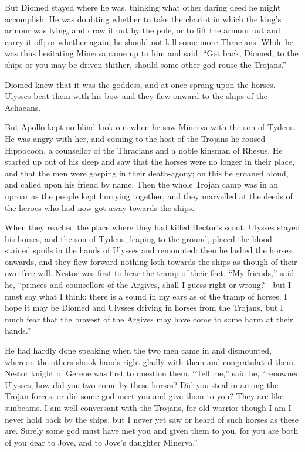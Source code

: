 But Diomed stayed where he was, thinking what other daring deed he might
accomplish. He was doubting whether to take the chariot in which the
king’s armour was lying, and draw it out by the pole, or to lift the
armour out and carry it off; or whether again, he should not kill some
more Thracians. While he was thus hesitating Minerva came up to him and
said, “Get back, Diomed, to the ships or you may be driven thither, should
some other god rouse the Trojans.”

Diomed knew that it was the goddess, and at once sprang upon the horses.
Ulysses beat them with his bow and they flew onward to the ships of the
Achaeans.

But Apollo kept no blind look-out when he saw Minerva with the son of
Tydeus. He was angry with her, and coming to the host of the Trojans he
roused Hippocoon, a counsellor of the Thracians and a noble kinsman of
Rhesus. He started up out of his sleep and saw that the horses were no
longer in their place, and that the men were gasping in their death-agony;
on this he groaned aloud, and called upon his friend by name. Then the
whole Trojan camp was in an uproar as the people kept hurrying together,
and they marvelled at the deeds of the heroes who had now got away towards
the ships.

When they reached the place where they had killed Hector’s scout, Ulysses
stayed his horses, and the son of Tydeus, leaping to the ground, placed
the blood-stained spoils in the hands of Ulysses and remounted: then he
lashed the horses onwards, and they flew forward nothing loth towards the
ships as though of their own free will. Nestor was first to hear the tramp
of their feet. “My friends,” said he, “princes and counsellors of the
Argives, shall I guess right or wrong?—but I must say what I think:
there is a sound in my ears as of the tramp of horses. I hope it may be
Diomed and Ulysses driving in horses from the Trojans, but I much fear
that the bravest of the Argives may have come to some harm at their
hands.”

He had hardly done speaking when the two men came in and dismounted,
whereon the others shook hands right gladly with them and congratulated
them. Nestor knight of Gerene was first to question them. “Tell me,” said
he, “renowned Ulysses, how did you two come by these horses? Did you steal
in among the Trojan forces, or did some god meet you and give them to you?
They are like sunbeams. I am well conversant with the Trojans, for old
warrior though I am I never hold back by the ships, but I never yet saw or
heard of such horses as these are. Surely some god must have met you and
given them to you, for you are both of you dear to Jove, and to Jove’s
daughter Minerva.”

